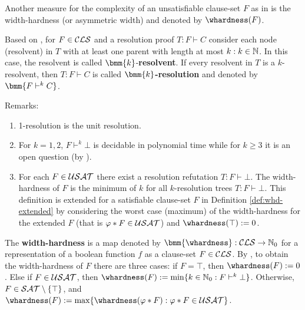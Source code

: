 \documentclass{report}
\begin{document}
Another measure for the complexity of an unsatisfiable clause-set $F$ as in \cite{BeyersdorffKullmann2014PHP, BeyersdorffGwynneKullmann2013PHPER} is the width-hardness (or asymmetric width) and denoted by $\whardness(F)$. 

\begin{defi}\label{def:kres}
Based on \cite{Kl93}, for $F \in \mathcal{CLS}$ and a resolution proof $T: F \vdash C$ consider each node (resolvent) in $T$ with at least one parent with length at most $k: k \in \mathbb{N}$. In this case, the resolvent is called $\bmm{k}$-\textbf{resolvent}. If every resolvent in $T$ is a $k$-resolvent, then $T:F \vdash C$ is called $\bmm{k}$\textbf{-resolution} and denoted by $\bmm{F \vdash^k C}$.
\end{defi}
Remarks:
  \begin{enumerate}
  \item 1-resolution is the unit resolution.
  \item For $k=1,2$, $F \vdash^k \bot$ is decidable in polynomial time while for $k \ge 3$ it is an open question (by \cite{BeyersdorffKullmann2014PHP}).
  \item For each $F \in \mathcal{USAT}$ there exist a resolution refutation $T:F \vdash \bot$. The width-hardness of $F$ is the minimum of $k$ for all $k$-resolution trees $T:F \vdash \bot$. This definition is extended for a satisfiable clause-set $F$ in Definition \ref{def:whd-extended} by considering the worst case (maximum) of the width-hardness for the extended $F$ (that is $ \varphi * F \in \mathcal{USAT}$) and $\whardness(\top):=0$.
  \end{enumerate}
 
\begin{defi}\label{def:whd-extended}
The \textbf{width-hardness} is a map denoted by $\bmm{\whardness} : \Cls \rightarrow \NNZ$ for a representation of a boolean function $f$ as a clause-set $F \in \mathcal{CLS}$. By \cite{GwynneKullmann2013GoodRepresentations}, to obtain the width-hardness of  $F$ there are three cases: if $F = \top$, then $\whardness(F) := 0$. Else if $F \in \mathcal{USAT}$, then $\whardness(F) := \min \set{k \in \NNZ : F \vdash^k \bot}$. Otherwise, $F \in \mathcal{SAT} \setminus \{ \top \}$, and $\whardness(F) := \max \set{ \whardness(\vp * F) : \vp * F \in \Usat }$.
\end{defi}
\end{document}
